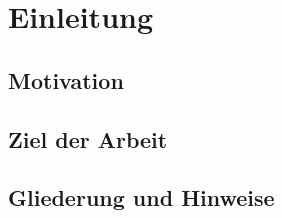 \chapter{Einleitung}
\label{ch:einleitung}

\section{Motivation}
\label{sec:motivation}

\blindtext[1]

\blindtext[4]

\section{Ziel der Arbeit}
\label{sec:ziel}

\blindtext[2]

\blindtext[5]

\section{Gliederung und Hinweise}
\label{sec:gliederung}

\blindtext[2]

\blindtext[3]